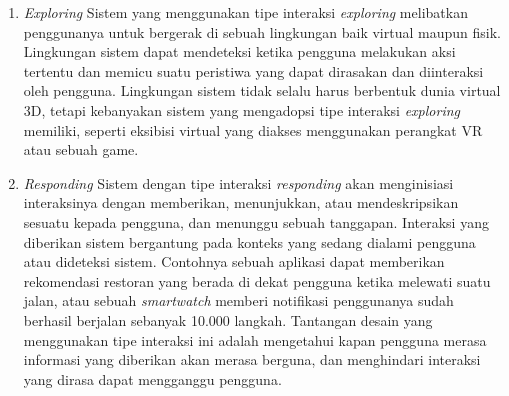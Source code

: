\begin{enumerate}
  \item \textit{Exploring}
  \subitem Sistem yang menggunakan tipe interaksi \textit{exploring} melibatkan penggunanya untuk bergerak di sebuah lingkungan baik virtual maupun fisik. Lingkungan sistem dapat mendeteksi ketika pengguna melakukan aksi tertentu dan memicu suatu peristiwa yang dapat dirasakan dan diinteraksi oleh pengguna. Lingkungan sistem tidak selalu harus berbentuk dunia virtual 3D, tetapi kebanyakan sistem yang mengadopsi tipe interaksi \textit{exploring} memiliki, seperti eksibisi virtual yang diakses menggunakan perangkat VR atau sebuah game.
  
  \item \textit{Responding}
  \subitem Sistem dengan tipe interaksi \textit{responding} akan menginisiasi interaksinya dengan memberikan, menunjukkan, atau mendeskripsikan sesuatu kepada pengguna, dan menunggu sebuah tanggapan. Interaksi yang diberikan sistem bergantung pada konteks yang sedang dialami pengguna atau dideteksi sistem.  Contohnya sebuah aplikasi dapat memberikan rekomendasi restoran yang berada di dekat pengguna ketika melewati suatu jalan, atau sebuah \textit{smartwatch} memberi notifikasi penggunanya sudah berhasil berjalan sebanyak 10.000 langkah. Tantangan desain yang menggunakan tipe interaksi ini adalah mengetahui kapan pengguna merasa informasi yang diberikan akan merasa berguna, dan menghindari interaksi yang dirasa dapat mengganggu pengguna.

\end{enumerate}

